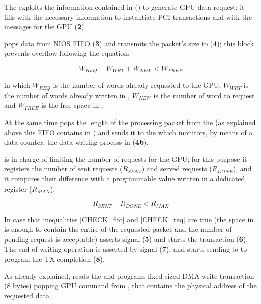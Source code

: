 The \nios exploits the information contained in 
() to generate GPU data request: it fills  with the necessary information to instantiate PCI transactions
and  with the messages for the GPU
(\textbf{2}).


 pops data from NIOS FIFO (\textbf{3}) and
transmits the packet's size to  (\textbf{4}); this
block prevents  overflow following the equation:


\begin{equation} 
\label{CHECK_fifo}
W_{REQ}-W_{WRT}+W_{NEW}<W_{FREE}
\end{equation}

in which $W_{REQ}$ is the number of words already requested to the
GPU, $W_{WRT}$ is the number of words already written in , $W_{NEW}$ is the number of word to request and $W_{FREE}$ is the
free space in .

At the same time  pops the length of the processing
packet from the  (as explained above this FIFO
contains \header in \ptoptx) and sends it to the  which monitors, by means of a data counter, the data writing
process in  (\textbf{4b}).

 is in charge of limiting the number of requests for the
GPU; for this purpose it registers the number of sent requests
($R_{SENT}$) and served requests ($R_{DONE}$), and it compares their
difference with a programmable value written in a dedicated register
($R_{MAX}$).

\begin{equation} 
\label{CHECK_req}
R_{SENT}-R_{DONE}<R_{MAX}
\end{equation}

In case that inequalities \ref{CHECK_fifo} and \ref{CHECK_req} are
true (the space in  is enough to contain the entire
\payload of the requested packet and the number of pending request is
acceptable)  asserts  signal
(\textbf{5}) and  starts the transaction
(\textbf{6}).
The end of writing operation is asserted by  signal
(\textbf{7}), and  starts sending  to
 to program the TX completion (\textbf{8}).

As already explained,  reads the  and programs fixed sized DMA write transaction (8 bytes)
popping GPU command from , that contains the
physical address of the requested data.

